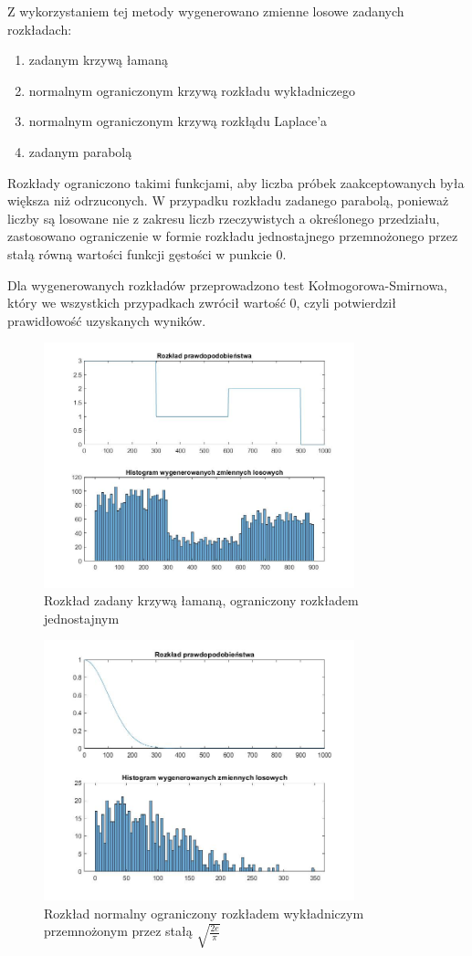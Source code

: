 \documentclass[a4paper,onecolumn,oneside,12pt,extrafontsizes]{article}
\begin{document}
Z wykorzystaniem tej metody wygenerowano zmienne losowe zadanych rozkładach:
\begin{enumerate}
	\item{zadanym krzywą łamaną}
	\item{normalnym ograniczonym krzywą rozkładu wykładniczego}
	\item{normalnym ograniczonym krzywą rozkłądu Laplace'a}
	\item{zadanym parabolą}
\end{enumerate}

Rozkłady ograniczono takimi funkcjami, aby liczba próbek zaakceptowanych była większa niż odrzuconych. W przypadku rozkładu zadanego parabolą, ponieważ liczby są losowane nie z zakresu liczb rzeczywistych a określonego przedziału, zastosowano ograniczenie w formie rozkładu jednostajnego przemnożonego przez stałą równą wartości funkcji gęstości w punkcie 0.

Dla wygenerowanych rozkładów przeprowadzono test Kołmogorowa-Smirnowa, który we wszystkich przypadkach zwrócił wartość 0, czyli potwierdził prawidłowość uzyskanych wyników.

\newpage 
\begin{figure}[!htb]
	\centering
	\caption{Rozkład zadany krzywą łamaną, ograniczony rozkładem jednostajnym}
	\includegraphics[width=9cm]{fig3.jpg}
\end{figure}

\begin{figure}[!htb]
	\centering
	\caption{Rozkład normalny ograniczony rozkładem wykładniczym przemnożonym przez stałą $\sqrt{\frac{2e}{\pi}}$ }
	\includegraphics[width=9cm]{fig4.jpg}
\end{figure}
\end{document}
